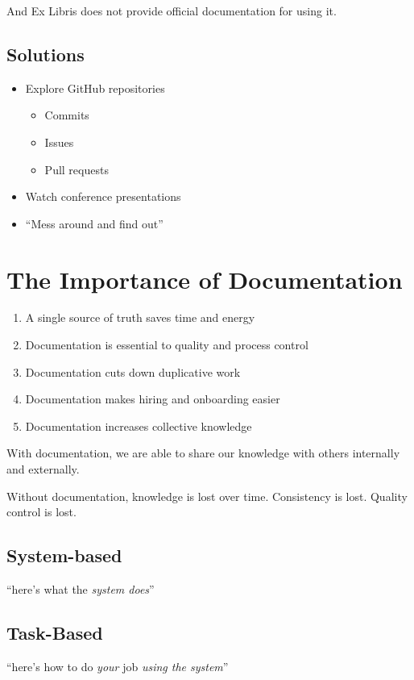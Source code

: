 \documentclass[11pt]{article}
\begin{document}
And Ex Libris does not provide official documentation for using it.

\subsection*{Solutions}
\label{sec:orgbc45faf}
\begin{itemize}
\item Explore GitHub repositories
\begin{itemize}
\item Commits
\item Issues
\item Pull requests
\end{itemize}
\item Watch conference presentations
\item ``Mess around and find out''
\end{itemize}

\section*{The Importance of Documentation}
\label{sec:orge15a6dc}
\begin{enumerate}
\item A single source of truth saves time and energy
\item Documentation is essential to quality and process control
\item Documentation cuts down duplicative work
\item Documentation makes hiring and onboarding easier
\item Documentation increases collective knowledge
\end{enumerate}

With documentation, we are able to share our knowledge with others internally and externally.

Without documentation, knowledge is lost over time.
Consistency is lost.
Quality control is lost.

\subsection*{System-based}
\label{sec:orgee8839b}
``here's what the \emph{system does}''
\subsection*{Task-Based}
\label{sec:org18d0b23}
``here's how to do \emph{your} job \emph{using the system}''
\end{document}
